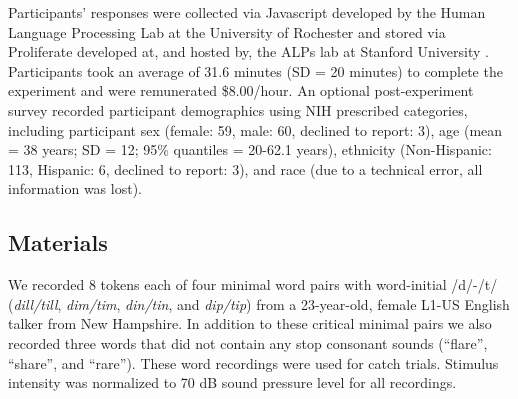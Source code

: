 \documentclass[
  11pt,
  man,mask,floatsintext]{apa6}
\begin{document}
Participants' responses were collected via Javascript developed by the Human Language Processing Lab at the University of Rochester \autocite{JSEXP2021} and stored via Proliferate developed at, and hosted by, the ALPs lab at Stanford University \autocite{Proliferate}. Participants took an average of 31.6 minutes (SD = 20 minutes) to complete the experiment and were remunerated \$8.00/hour. An optional post-experiment survey recorded participant demographics using NIH prescribed categories, including participant sex (female: 59, male: 60, declined to report: 3), age (mean = 38 years; SD = 12; 95\% quantiles = 20-62.1 years), ethnicity (Non-Hispanic: 113, Hispanic: 6, declined to report: 3), and race (due to a technical error, all information was lost).

\subsection{Materials}\label{materials}

We recorded 8 tokens each of four minimal word pairs with word-initial /d/-/t/ (\emph{dill/till}, \emph{dim/tim}, \emph{din/tin}, and \emph{dip/tip}) from a 23-year-old, female L1-US English talker from New Hampshire. In addition to these critical minimal pairs we also recorded three words that did not contain any stop consonant sounds (``flare'', ``share'', and ``rare''). These word recordings were used for catch trials. Stimulus intensity was normalized to 70 dB sound pressure level for all recordings.
\end{document}
